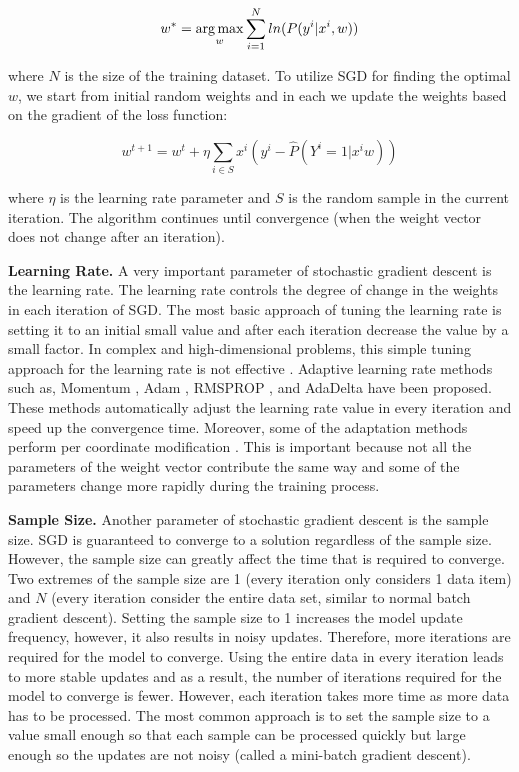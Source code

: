 \begin{center}
$$w^* = \operatorname*{arg\,max}_w \sum_{i=1}^{N} ln(P(y^i | x^i, w))$$
\end{center}

where $N$ is the size of the training dataset.
To utilize SGD for finding the optimal $w$, we start from initial random weights and in each we update the weights based on the gradient of the loss function:

\begin{center}
$${w}^{t+1} = {w}^t + \eta \sum_{i \in S} x^i (y^i - \hat{P}(Y^i = 1 | x^i w))$$
\end{center}

where $\eta$ is the learning rate parameter and $S$ is the random sample in the current iteration.
The algorithm continues until convergence (when the weight vector does not change after an iteration).

\textbf{Learning Rate.}
A very important parameter of stochastic gradient descent is the learning rate.
The learning rate controls the degree of change in the weights in each iteration of SGD.
The most basic approach of tuning the learning rate is setting it to an initial small value and after each iteration decrease the value by a small factor.
In complex and high-dimensional problems, this simple tuning approach for the learning rate is not effective \cite{schaul2013no}. 
Adaptive learning rate methods such as, Momentum \cite{qian1999momentum}, Adam \cite{kingma2014adam}, RMSPROP \cite{tieleman2012lecture}, and AdaDelta \cite{zeiler2012adaptive} have been proposed.
These methods automatically adjust the learning rate value in every iteration and speed up the convergence time.
Moreover, some of the adaptation methods perform per coordinate modification \cite{schaul2013no, tieleman2012lecture, zeiler2012adaptive}. 
This is important because not all the parameters of the weight vector contribute the same way and some of the parameters change more rapidly during the training process.

\textbf{Sample Size.}
Another parameter of stochastic gradient descent is the sample size.
SGD is guaranteed to converge to a solution regardless of the sample size.
However, the sample size can greatly affect the time that is required to converge.
Two extremes of the sample size are 1 (every iteration only considers 1 data item) and $N$ (every iteration consider the entire data set, similar to normal batch gradient descent).
Setting the sample size to 1 increases the model update frequency, however, it also results in noisy updates.
Therefore, more iterations are required for the model to converge.
Using the entire data in every iteration leads to more stable updates and as a result, the number of iterations required for the model to converge is fewer.
However, each iteration takes more time as more data has to be processed.
The most common approach is to set the sample size to a value small enough so that each sample can be processed quickly but large enough so the updates are not noisy (called a mini-batch gradient descent).

